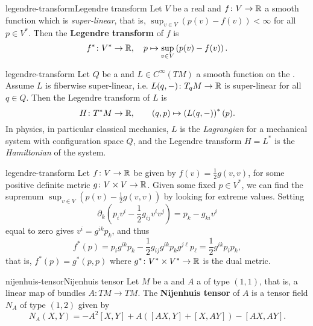 \begin{topic}{legendre-transform}{Legendre transform}
    Let $V$ be a real  and $f \colon V \to \mathbb{R}$ a smooth function which is \textit{super-linear}, that is, $\sup_{v \in V} \left(p(v) - f(v) \right) < \infty$ for all $p \in V^*$. Then the \textbf{Legendre transform} of $f$ is
    \[ f^* \colon V^* \to \mathbb{R}, \quad p \mapsto \sup_{v \in V} \left(p(v) - f(v) \right) . \]
\end{topic}

\begin{example}{legendre-transform}
    Let $Q$ be a  and $L \in C^\infty(TM)$ a smooth function on the . Assume $L$ is fiberwise super-linear, i.e. $L(q, -) \colon T_q M \to \mathbb{R}$ is super-linear for all $q \in Q$. Then the Legendre transform of $L$ is
    \[ H \colon T^*M \to \mathbb{R}, \qquad (q, p) \mapsto \left(L(q, -)\right)^*(p) . \]
    In physics, in particular classical mechanics, $L$ is the \textit{Lagrangian} for a mechanical system with configuration space $Q$, and the Legendre transform $H = L^*$ is the \textit{Hamiltonian} of the system.
\end{example}

\begin{example}{legendre-transform}
    Let $f \colon V \to \mathbb{R}$ be given by $f(v) = \tfrac{1}{2} g(v, v)$, for some positive definite metric $g \colon V \times V \to \mathbb{R}$. Given some fixed $p \in V^*$, we can find the supremum $\sup_{v \in V} \left(p(v) - \tfrac{1}{2} g(v, v)\right)$ by looking for extreme values. Setting
    \[ \partial_k \left( p_i v^i - \frac{1}{2} g_{ij} v^i v^j \right) = p_k - g_{ki} v^i \]
    equal to zero gives $v^i = g^{ik} p_k$, and thus
    \[ f^*(p) = p_i g^{ik} p_k - \frac{1}{2} g_{ij} g^{i k} p_k g^{j \ell} p_\ell = \frac{1}{2} g^{ik} p_i p_k , \]
    that is, $f^*(p) = g^*(p, p)$ where $g^* \colon V^* \times V^* \to \mathbb{R}$ is the dual metric.
\end{example}

\begin{topic}{nijenhuis-tensor}{Nijenhuis tensor}
    Let $M$ be a  and $A$ a  of type $(1, 1)$, that is, a linear map of bundles $A \colon TM \to TM$. The \textbf{Nijenhuis tensor} of $A$ is a tensor field $N_A$ of type $(1, 2)$ given by
    \[ N_A(X, Y) = -A^2 [X, Y] + A([AX, Y] + [X, AY]) - [AX, AY] . \]
\end{topic}

